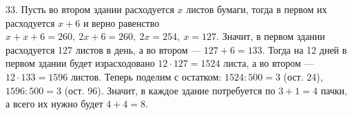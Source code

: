 33. Пусть во втором здании расходуется $x$ листов бумаги, тогда в первом их расходуется $x+6$ и верно равенство $x+x+6=260,\ 2x+6=260,\ 2x=254,\ x=127.$ Значит, в первом здании расходуется 127 листов в день, а во втором --- $127+6=133.$ Тогда на 12 дней в первом здании будет израсходовано $12\cdot127=1524$ листа, а во втором --- $12\cdot133=1596$ листов. Теперь поделим с остатком: $1524:500=3$ (ост. 24), $1596:500=3$ (ост. 96). Значит, в каждое здание потребуется по $3+1=4$ пачки, а всего их нужно будет $4+4=8.$\\

